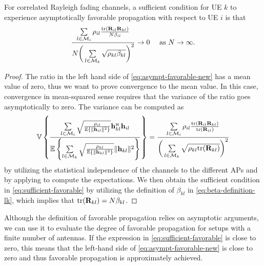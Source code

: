 \begin{lemma}
For correlated Rayleigh fading channels, a sufficient condition for UE $k$ to experience 
asymptotically favorable propagation with respect to UE $i$ is that 
\begin{equation} \label{eq:sufficient-favorable}
\frac{ \sum\limits_{l \in \mathcal{M}_i} \rho_{il} \frac{\mathrm{tr} ( \mathbf{R}_{il} \mathbf{R}_{kl} ) }{N \beta_{il} }
}{ N \bigg( \sum\limits_{l \in \mathcal{M}_k} \sqrt{\rho_{kl}  \beta_{kl}} 
\bigg)^2 } \to 0 \quad  \textrm{ as } N \to \infty.
\end{equation}
\end{lemma}
\begin{proof}
The ratio in the left hand side of \eqref{eq:asympt-favorable-new} has a mean value of zero, thus we want to prove convergence to the mean value. In this case, convergence in mean-squared sense requires that the variance of the ratio goes asymptotically to zero. The variance can be computed as
\begin{equation}
\mathbb{V}\left\{ 
\frac{ \sum\limits_{l \in \mathcal{M}_i}   \sqrt{\frac{\rho_{il}}{\mathbb{E} \{\| \vect{h}_{il} \|^2 \}} } \vect{h}_{kl}^{\Htran}  \vect{h}_{il} }{ \mathbb{E} \left\{ \sum\limits_{l \in \mathcal{M}_k} \sqrt{\frac{\rho_{kl}}{\mathbb{E} \{\| \vect{h}_{kl} \|^2 \}} } \| \vect{h}_{kl} \|^2  \right\} }  
\right\} = \frac{ \sum\limits_{l \in \mathcal{M}_i} \rho_{il} \frac{\tr ( \vect{R}_{il} \vect{R}_{kl} ) }{\tr ( \vect{R}_{il} ) }
}{ \bigg( \sum\limits_{l \in \mathcal{M}_k} \sqrt{\rho_{kl} \tr ( \vect{R}_{kl} )} 
\bigg)^2 } 
\end{equation}
by utilizing the statistical independence of the channels to the different \glspl{AP} and by applying \cite[Lemma B.14]{massivemimobook} to compute the expectations. We then obtain the sufficient condition in \eqref{eq:sufficient-favorable} by utilizing the definition of $\beta_{kl}$ in \eqref{eq:beta-definition-lk}, which implies that $ \mathrm{tr} ( \mathbf{R}_{kl} ) = N \beta_{kl}$.
\end{proof}

Although the definition of favorable propagation relies on asymptotic arguments, we can use it to evaluate the degree of favorable propagation for setups with a finite number of antennas. If the expression in \eqref{eq:sufficient-favorable} is close to zero, this means that the left-hand side of \eqref{eq:asympt-favorable-new} is close to zero and thus favorable propagation is approximately achieved.

